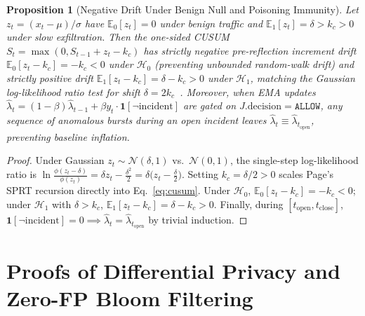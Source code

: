 \documentclass[10pt,twocolumn,letterpaper]{article}
\makeatletter
\theoremstyle{plain}
\newtheorem{proposition}[theorem]{Proposition}
\theoremstyle{definition}
\theoremstyle{remark}
\DeclareRobustCommand{\_}{\ifmmode\nfss@text{\textunderscore}\else\textunderscore\penalty\@highpenalty\hskip\z@skip\fi}
\makeatother
\begin{document}
\begin{proposition}[Negative Drift Under Benign Null and Poisoning Immunity]
Let $z_t = (x_t - \mu)/\sigma$ have $\mathbb{E}_0[z_t] = 0$ under benign traffic and $\mathbb{E}_1[z_t] = \delta > k_c > 0$ under slow exfiltration. Then the one-sided CUSUM $S_t = \max(0, S_{t-1} + z_t - k_c)$ has strictly negative pre-reflection increment drift $\mathbb{E}_0[z_t - k_c] = -k_c < 0$ under $\mathcal{H}_0$ (preventing unbounded random-walk drift) and strictly positive drift $\mathbb{E}_1[z_t - k_c] = \delta - k_c > 0$ under $\mathcal{H}_1$, matching the Gaussian log-likelihood ratio test for shift $\delta = 2 k_c$~\cite{page1954continuous,lorden1971procedures}. Moreover, when EMA updates $\hat{\lambda}_t = (1 - \beta)\hat{\lambda}_{t-1} + \beta y_t \cdot \mathbf{1}[\neg\text{incident}]$ are gated on $J.\text{decision} = \texttt{ALLOW}$, any sequence of anomalous bursts during an open incident leaves $\hat{\lambda}_t \equiv \hat{\lambda}_{t_{\text{open}}}$, preventing baseline inflation.
\end{proposition}
\begin{proof}
Under Gaussian $z_t \sim \mathcal{N}(\delta, 1)$ vs.\ $\mathcal{N}(0, 1)$, the single-step log-likelihood ratio is $\ln \frac{\phi(z_t - \delta)}{\phi(z_t)} = \delta z_t - \frac{\delta^2}{2} = \delta\big(z_t - \frac{\delta}{2}\big)$. Setting $k_c = \delta/2 > 0$ scales Page's SPRT recursion directly into Eq.~\eqref{eq:cusum}. Under $\mathcal{H}_0$, $\mathbb{E}_0[z_t - k_c] = -k_c < 0$; under $\mathcal{H}_1$ with $\delta > k_c$, $\mathbb{E}_1[z_t - k_c] = \delta - k_c > 0$. Finally, during $[t_{\text{open}}, t_{\text{close}}]$, $\mathbf{1}[\neg\text{incident}] = 0 \implies \hat{\lambda}_t = \hat{\lambda}_{t_{\text{open}}}$ by trivial induction.
\end{proof}

\section{Proofs of Differential Privacy and Zero-FP Bloom Filtering}
\label{app:privacy}
\end{document}
